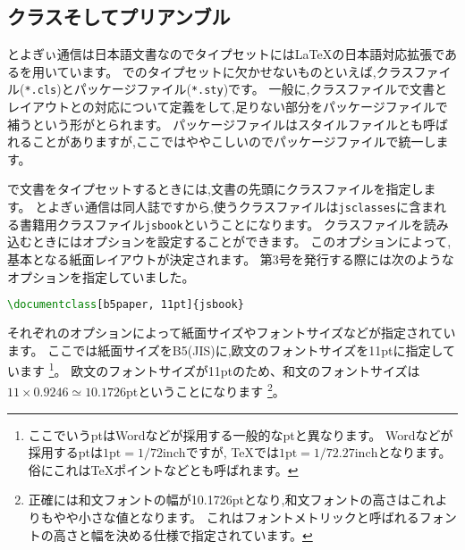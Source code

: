 \subsection{クラスそしてプリアンブル}

とよぎぃ通信は日本語文書なのでタイプセットには{\LaTeX}の日本語対応拡張である{\pLaTeX}を用いています。
{\pLaTeX}でのタイプセットに欠かせないものといえば,クラスファイル(\texttt{*.cls})とパッケージファイル(\texttt{*.sty})です。
一般に,クラスファイルで文書とレイアウトとの対応について定義をして,足りない部分をパッケージファイルで補うという形がとられます。
パッケージファイルはスタイルファイルとも呼ばれることがありますが,ここではややこしいのでパッケージファイルで統一します。

{\pLaTeX}で文書をタイプセットするときには,文書の先頭にクラスファイルを指定します。
とよぎぃ通信は同人誌ですから,使うクラスファイルは\texttt{jsclasses}に含まれる書籍用クラスファイル\texttt{jsbook}ということになります。
クラスファイルを読み込むときにはオプションを設定することができます。
このオプションによって,基本となる紙面レイアウトが決定されます。
第3号を発行する際には次のようなオプションを指定していました。
\begin{lstlisting}[caption=クラスファイルの指定,label=lis:class,language=tex]
\documentclass[b5paper, 11pt]{jsbook}
\end{lstlisting}
それぞれのオプションによって紙面サイズやフォントサイズなどが指定されています。
ここでは紙面サイズをB5(JIS)に,欧文のフォントサイズを11ptに指定しています
\footnote{ここでいうptはWordなどが採用する一般的なptと異なります。
Wordなどが採用するptは$1\mathrm{pt} = 1 / 72\mathrm{inch}$ですが,
{\TeX}では$1\mathrm{pt} = 1 / 72.27\mathrm{inch}$となります。
俗にこれは{\TeX}ポイントなどとも呼ばれます。}。
欧文のフォントサイズが11ptのため、和文のフォントサイズは$11 \times 0.9246 \simeq 10.1726$ptということになります
\footnote{正確には和文フォントの幅が10.1726ptとなり,和文フォントの高さはこれよりもやや小さな値となります。
これはフォントメトリックと呼ばれるフォントの高さと幅を決める仕様で指定されています。}。

